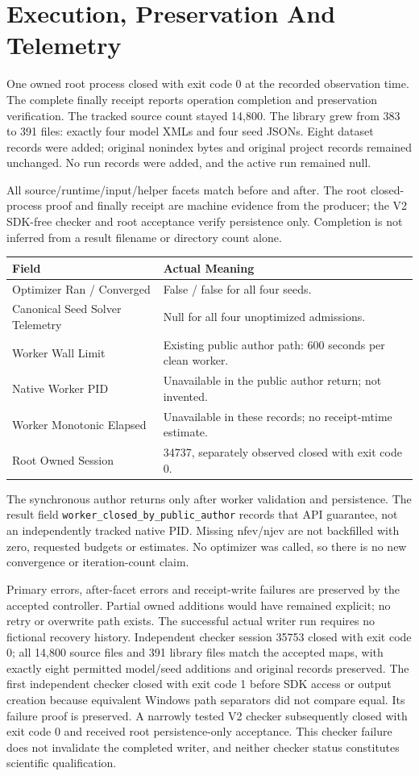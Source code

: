 \documentclass[11pt,letterpaper]{article}
\newcommand{\code}[1]{\nolinkurl{#1}}\newcommand{\hash}[1]{{\footnotesize\nolinkurl{#1}}}
\newcommand{\chapterpage}[1]{\clearpage\section{#1}}
\begin{document}
\chapterpage{Execution, Preservation And Telemetry}
One owned root process closed with exit code 0 at the recorded observation time. The complete finally receipt reports operation completion and preservation verification. The tracked source count stayed 14,800. The library grew from 383 to 391 files: exactly four model XMLs and four seed JSONs. Eight dataset records were added; original nonindex bytes and original project records remained unchanged. No run records were added, and the active run remained null.

All source/runtime/input/helper facets match before and after. The root closed-process proof and finally receipt are machine evidence from the producer; the V2 SDK-free checker and root acceptance verify persistence only. Completion is not inferred from a result filename or directory count alone.

\begin{tabular}{@{}p{2.55in}p{3.4in}@{}}\toprule
Field & Actual Meaning\\\midrule
Optimizer Ran / Converged & False / false for all four seeds.\\
Canonical Seed Solver Telemetry & Null for all four unoptimized admissions.\\
Worker Wall Limit & Existing public author path: 600 seconds per clean worker.\\
Native Worker PID & Unavailable in the public author return; not invented.\\
Worker Monotonic Elapsed & Unavailable in these records; no receipt-mtime estimate.\\
Root Owned Session & 34737, separately observed closed with exit code 0.\\\bottomrule
\end{tabular}

The synchronous author returns only after worker validation and persistence. The result field \code{worker_closed_by_public_author} records that API guarantee, not an independently tracked native PID. Missing nfev/njev are not backfilled with zero, requested budgets or estimates. No optimizer was called, so there is no new convergence or iteration-count claim.

Primary errors, after-facet errors and receipt-write failures are preserved by the accepted controller. Partial owned additions would have remained explicit; no retry or overwrite path exists. The successful actual writer run requires no fictional recovery history. Independent checker session 35753 closed with exit code 0; all 14,800 source files and 391 library files match the accepted maps, with exactly eight permitted model/seed additions and original records preserved. The first independent checker closed with exit code 1 before SDK access or output creation because equivalent Windows path separators did not compare equal. Its failure proof is preserved. A narrowly tested V2 checker subsequently closed with exit code 0 and received root persistence-only acceptance. This checker failure does not invalidate the completed writer, and neither checker status constitutes scientific qualification.
\end{document}
